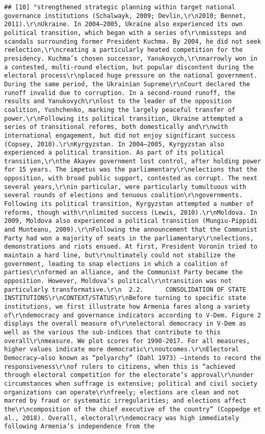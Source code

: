 \documentclass[
]{article}
\begin{document}
\begin{verbatim}
## [10] "strengthened strategic planning within target national governance institutions (Schalwayk, 2009; Devlin,\r\n2010; Bennet, 2011).\r\nUkraine. In 2004–2005, Ukraine also experienced its own political transition, which began with a series of\r\nmissteps and scandals surrounding former President Kuchma. By 2004, he did not seek reelection,\r\ncreating a particularly heated competition for the presidency. Kuchma’s chosen successor, Yanukovych,\r\nnarrowly won in a contested, multi-round election, but popular discontent during the electoral process\r\nplaced huge pressure on the national government. During the same period, the Ukrainian Supreme\r\nCourt declared the runoff invalid due to corruption. In a second-round runoff, the results and Yanukovych\r\nlost to the leader of the opposition coalition, Yushchenko, marking the largely peaceful transfer of power.\r\nFollowing its political transition, Ukraine attempted a series of transitional reforms, both domestically and\r\nwith international engagement, but did not enjoy significant success (Copsey, 2010).\r\nKyrgyzstan. In 2004–2005, Kyrgyzstan also experienced a political transition. As part of its political transition,\r\nthe Akayev government lost control, after holding power for 15 years. The impetus was the parliamentary\r\nelections that the opposition, with broad public support, contested as corrupt. The next several years,\r\nin particular, were particularly tumultuous with several rounds of elections and tenuous coalition\r\ngovernments. Following its political transition, Kyrgyzstan attempted a number of reforms, though with\r\nlimited success (Lewis, 2010).\r\nMoldova. In 2009, Moldova also experienced a political transition (Mungiu-Pippidi and Munteanu, 2009).\r\nFollowing the announcement that the Communist Party had won a majority of seats in the parliamentary\r\nelections, demonstrations and riots ensued. At first, President Voronin tried to maintain a hard line, but\r\nultimately could not stabilize the government, leading to snap elections in which a coalition of parties\r\nformed an alliance, and the Communist Party became the opposition. However, Moldova’s political\r\ntransition was not particularly transformative.\r\n  2.2.      CONSOLIDATION OF STATE INSTITUTIONS\r\nCONTEXT/STATUS\r\nBefore turning to specific state institutions, we first illustrate how Armenia fares along a variety of\r\ndemocracy and governance indicators according to V-Dem. Figure 2 displays the overall measure of\r\nelectoral democracy in V-Dem as well as the various the sub-indices that contribute to this overall\r\nmeasure. We plot scores for 1990-2017. For all measures, higher values indicate more democratic\r\noutcomes.\r\nElectoral Democracy—also known as “polyarchy” (Dahl 1973) —intends to record the responsiveness\r\nof rulers to citizens, when this is “achieved through electoral competition for the electorate’s approval\r\nunder circumstances when suffrage is extensive; political and civil society organizations can operate\r\nfreely; elections are clean and not marred by fraud or systematic irregularities; and elections affect the\r\ncomposition of the chief executive of the country” (Coppedge et al., 2018). Overall, electoral\r\ndemocracy was high immediately following Armenia’s independence from the 
\end{verbatim}
\end{document}
